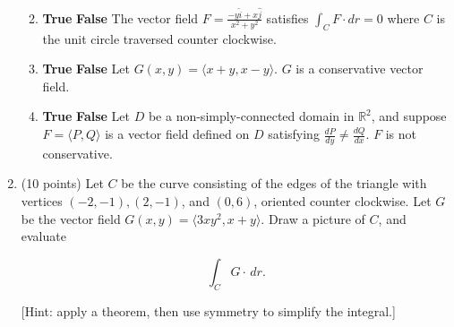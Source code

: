 \documentclass[12 pt]{report}
\begin{document}
\begin{enumerate}
\begin{enumerate}
\vfill

\item \textbf{True} \hspace{5pt} \textbf{False} \hspace{10pt} The vector field $F = \frac{-y \hat{i} + x \hat{j}}{x^2+y^2}$ satisfies $\int_C F \cdot dr = 0$ where $C$ is the unit circle traversed counter clockwise. 

\vfill

\item \textbf{True} \hspace{5pt} \textbf{False} \hspace{10pt} Let $G(x,y) = \langle x + y, x - y \rangle$. $G$ is a conservative vector field. 

\vfill

\item \textbf{True} \hspace{5pt} \textbf{False} \hspace{10pt} Let $D$ be a non-simply-connected domain in $\mathbb{R}^2$, and suppose $F = \langle P, Q \rangle$ is a vector field defined on $D$ satisfying $\frac{dP}{dy} \neq \frac{dQ}{dx}$. $F$ is not conservative. 

\vfill

\end{enumerate}

\newpage


\item (10 points) Let $C$ be the curve consisting of the edges of the triangle with vertices $(-2,-1), (2,-1)$, and $(0,6)$, oriented counter clockwise. Let $G$ be the vector field $G(x,y) = \langle 3xy^2, x+y \rangle.$ Draw a picture of $C$, and evaluate

\[
\int_C G \cdot \, dr.
\]

[Hint: apply a theorem, then use symmetry to simplify the integral.]

\end{enumerate}
\end{document}
